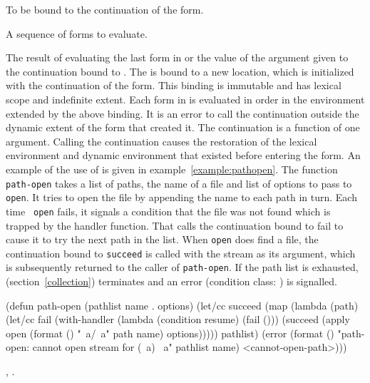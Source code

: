 \begin{optDefinition}

%
\Syntax
{}%
%
\begin{arguments}
    \item[\scref{identifier}] To be bound to the continuation of the
     form.
    \item[\scref{body}] A sequence of forms to evaluate.
\end{arguments}
%
\result%
The result of evaluating the last form in  or the value of
the argument given to the continuation bound to .
%
\remarks%
The  is bound to a new location, which is initialized with the
continuation of the  form.  This binding is immutable and has
lexical scope and indefinite extent.  Each form in  is evaluated in order
in the environment extended by the above binding.  It is an error to call the
continuation outside the dynamic extent of the  form that
created it.  The continuation is a function of one argument.  Calling the
continuation causes the restoration of the lexical environment and dynamic
environment that existed before entering the  form.
%
\examples%
An example of the use of  is given in
example~\ref{example:pathopen}.  The function {\tt path-open} takes a list of
paths, the name of a file and list of options to pass to {\tt open}.  It tries
to open the file by appending the name to each path in turn.  Each time {\tt
    open} fails, it signals a condition that the file was not found which is
trapped by the handler function.  That calls the continuation bound to fail to
cause it to try the next path in the list.  When {\tt open} does find a file,
the continuation bound to {\tt succeed} is called with the stream as its
argument, which is subsequently returned to the caller of {\tt path-open}.  If
the path list is exhausted,  (section~\ref{collection})
terminates and an error (condition class: ) is
signalled.
%
\begin{example}
\label{example:pathopen}
{\codeExample
(defun path-open (pathlist name . options)
  (let/cc succeed
    (map
      (lambda (path)
        (let/cc fail
          (with-handler
            (lambda (condition resume) (fail ()))
            (succeed (apply open
                       (format () "~a/~a" path name)
                       options)))))
      pathlist)
    (error
      (format ()
        "path-open: cannot open stream for (~a) ~a"
        pathlist name)
      <cannot-open-path>)))
\endCodeExample}
\end{example}
%
\seealso%
, .


\end{optDefinition}
